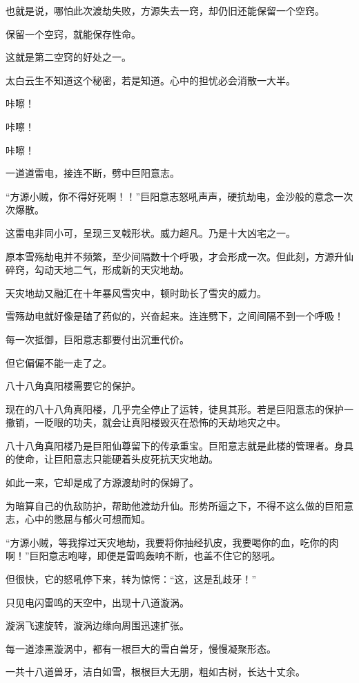 \begin{this_body}
也就是说，哪怕此次渡劫失败，方源失去一窍，却仍旧还能保留一个空窍。

保留一个空窍，就能保存性命。

这就是第二空窍的好处之一。

太白云生不知道这个秘密，若是知道。心中的担忧必会消散一大半。

咔嚓！

咔嚓！

咔嚓！

一道道雷电，接连不断，劈中巨阳意志。

“方源小贼，你不得好死啊！！”巨阳意志怒吼声声，硬抗劫电，金沙般的意念一次次爆散。

这雷电非同小可，呈现三叉戟形状。威力超凡。乃是十大凶宅之一。

原本雪殇劫电并不频繁，至少间隔数十个呼吸，才会形成一次。但此刻，方源升仙碎窍，勾动天地二气，形成新的天灾地劫。

天灾地劫又融汇在十年暴风雪灾中，顿时助长了雪灾的威力。

雪殇劫电就好像是磕了药似的，兴奋起来。连连劈下，之间间隔不到一个呼吸！

每一次抵御，巨阳意志都要付出沉重代价。

但它偏偏不能一走了之。

八十八角真阳楼需要它的保护。

现在的八十八角真阳楼，几乎完全停止了运转，徒具其形。若是巨阳意志的保护一撤销，一眨眼的功夫，就会让真阳楼毁灭在恐怖的天劫地灾之中。

八十八角真阳楼乃是巨阳仙尊留下的传承重宝。巨阳意志就是此楼的管理者。身具的使命，让巨阳意志只能硬着头皮死抗天灾地劫。

如此一来，它却是成了方源渡劫时的保姆了。

为暗算自己的仇敌防护，帮助他渡劫升仙。形势所逼之下，不得不这么做的巨阳意志，心中的憋屈与郁火可想而知。

“方源小贼，等我撑过天灾地劫，我要将你抽经扒皮，我要喝你的血，吃你的肉啊！”巨阳意志咆哮，即便是雷鸣轰响不断，也盖不住它的怒吼。

但很快，它的怒吼停下来，转为惊愕：“这，这是乱歧牙！”

只见电闪雷鸣的天空中，出现十八道漩涡。

漩涡飞速旋转，漩涡边缘向周围迅速扩张。

每一道漆黑漩涡中，都有一根巨大的雪白兽牙，慢慢凝聚形态。

一共十八道兽牙，洁白如雪，根根巨大无朋，粗如古树，长达十丈余。


\end{this_body}
